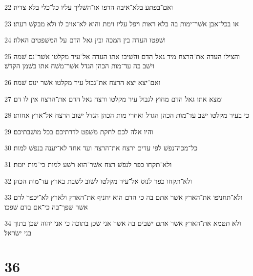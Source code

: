 \par 22 ואם־בפתע בלא־איבה הדפו או־השׁליך עליו כל־כלי בלא צדיה׃
\par 23 או בכל־אבן אשׁר־ימות בה בלא ראות ויפל עליו וימת והוא לא־אויב לו ולא מבקשׁ רעתו׃
\par 24 ושׁפטו העדה בין המכה ובין גאל הדם על המשׁפטים האלה׃
\par 25 והצילו העדה את־הרצח מיד גאל הדם והשׁיבו אתו העדה אל־עיר מקלטו אשׁר־נס שׁמה וישׁב בה עד־מות הכהן הגדל אשׁר־משׁח אתו בשׁמן הקדשׁ׃
\par 26 ואם־יצא יצא הרצח את־גבול עיר מקלטו אשׁר ינוס שׁמה׃
\par 27 ומצא אתו גאל הדם מחוץ לגבול עיר מקלטו ורצח גאל הדם את־הרצח אין לו דם׃
\par 28 כי בעיר מקלטו ישׁב עד־מות הכהן הגדל ואחרי מות הכהן הגדל ישׁוב הרצח אל־ארץ אחזתו׃
\par 29 והיו אלה לכם לחקת משׁפט לדרתיכם בכל מושׁבתיכם׃
\par 30 כל־מכה־נפשׁ לפי עדים ירצח את־הרצח ועד אחד לא־יענה בנפשׁ למות׃
\par 31 ולא־תקחו כפר לנפשׁ רצח אשׁר־הוא רשׁע למות כי־מות יומת׃
\par 32 ולא־תקחו כפר לנוס אל־עיר מקלטו לשׁוב לשׁבת בארץ עד־מות הכהן׃
\par 33 ולא־תחניפו את־הארץ אשׁר אתם בה כי הדם הוא יחניף את־הארץ ולארץ לא־יכפר לדם אשׁר שׁפך־בה כי־אם בדם שׁפכו׃
\par 34 ולא תטמא את־הארץ אשׁר אתם ישׁבים בה אשׁר אני שׁכן בתוכה כי אני יהוה שׁכן בתוך בני ישׂראל׃

\chapter{36}


